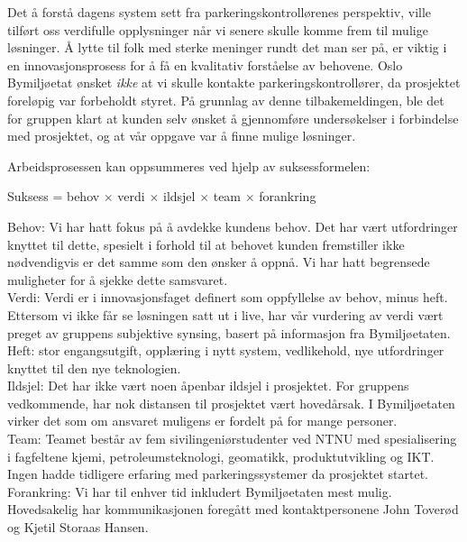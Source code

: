 \documentclass[xetex]{beamer}
\begin{document}
\begin{frame}
Det å \alert{forstå dagens system} sett fra parkeringskontrollørenes perspektiv, ville tilført oss verdifulle opplysninger når vi senere skulle komme frem til mulige løsninger. Å lytte til folk med sterke meninger rundt det man ser på, er viktig i en innovasjonsprosess for å få en kvalitativ forståelse av behovene. Oslo Bymiljøetat ønsket \emph{ikke} at vi skulle kontakte parkeringskontrollører, da prosjektet foreløpig var \alert{forbeholdt styret}. På grunnlag av denne tilbakemeldingen, ble det for gruppen klart at kunden selv ønsket å gjennomføre undersøkelser i forbindelse med prosjektet, og at \alert{vår oppgave var å finne mulige løsninger}.
\end{frame}










\begin{frame}
	Arbeidsprosessen kan oppsummeres ved hjelp av suksessformelen:
	\vspace{-2em}\begin{center}
		{\footnotesize%
			Suksess \alert{=} behov \alert{$\times$} verdi \alert{$\times$} ildsjel \alert{$\times$} team \alert{$\times$} forankring
		}
	\end{center}\vspace{-2em}
	\alert{Behov:} Vi har hatt fokus på å avdekke kundens behov. Det har vært utfordringer knyttet til dette, spesielt i forhold til at behovet kunden fremstiller ikke nødvendigvis er det samme som den ønsker å oppnå. Vi har hatt begrensede muligheter for å sjekke dette samsvaret. \\ [1em]
	\alert{Verdi:} Verdi er i innovasjonsfaget definert som oppfyllelse av behov, minus heft. Ettersom vi ikke får se løsningen satt ut i live, har vår vurdering av verdi vært preget av gruppens subjektive synsing, basert på informasjon fra Bymiljøetaten. Heft: stor engangsutgift, opplæring i nytt system, vedlikehold, nye utfordringer knyttet til den nye teknologien.  \\ [1em]	
	\alert{Ildsjel:} Det har ikke vært noen åpenbar ildsjel i prosjektet. For gruppens vedkommende, har nok distansen til prosjektet vært hovedårsak. I Bymiljøetaten virker det som om ansvaret muligens er fordelt på for mange personer.  \\ [1em]	
	\alert{Team:} Teamet består av fem sivilingeniørstudenter ved NTNU med spesialisering i fagfeltene kjemi, petroleumsteknologi, geomatikk, produktutvikling og IKT. Ingen hadde tidligere erfaring med parkeringssystemer da prosjektet startet.  \\ [1em]	
	\alert{Forankring:} Vi har til enhver tid inkludert Bymiljøetaten mest mulig. Hovedsakelig har kommunikasjonen foregått med kontaktpersonene John Toverød og Kjetil Storaas Hansen.	
\end{frame}
\end{document}
